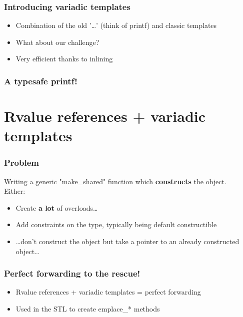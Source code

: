 \documentclass[xcolor=dvipsnames]{beamer}
\begin{document}
\begin{frame}[fragile]
  \frametitle{Introducing variadic templates}
  \begin{itemize}
    \item Combination of the old '\ldots' (think of printf) and classic templates
    \pause
    \item What about our challenge?
    \pause
  \end{itemize}

  

  \begin{itemize}
    \item Very efficient thanks to inlining
  \end{itemize}
\end{frame}

\begin{frame}[fragile]
    
  \frametitle{A typesafe printf!}

  
\end{frame}

\section{Rvalue references + variadic templates}
\begin{frame}[fragile]
  \frametitle{Problem}
  Writing a generic "make\_shared" function which \textbf{constructs} the object.\\
  Either:
  \begin{itemize}
    \item Create \textbf{a lot} of overloads\ldots
      \pause
    \item Add constraints on the type, typically being default constructible
      \pause
    \item \ldots don't construct the object but take a pointer to an already constructed object\ldots
  \end{itemize}

  

\end{frame}
\begin{frame}[fragile]
  \frametitle{Perfect forwarding to the rescue!}
  \begin{itemize}
    \item Rvalue references + variadic templates = perfect forwarding
  \end{itemize}

  
  \pause
  \begin{itemize}
    \item Used in the STL to create emplace\_* methods
  \end{itemize}

  
\end{frame}
\end{document}
